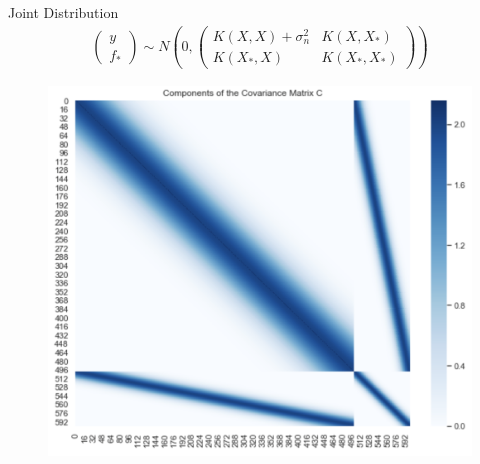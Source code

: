 \documentclass[10pt]{beamer}
\begin{document}
\begin{frame}{Joint Distribution}
\begin{align*}
\left(
\begin{array}{c}
y \\
f_*
\end{array}
\right)
\sim
N\left(0, 
\left(
\begin{array}{cc}
K(X,X)+\sigma_n^2 & K(X,X_*) \\
K(X_*,X) & K(X_*,X_*)
\end{array}
\right)
\right)
\end{align*}
\begin{center}
\begin{figure}
\includegraphics[scale=0.25]{images/cov_prior_example2.png} 
\end{figure}
\end{center}
\end{frame}
\end{document}
